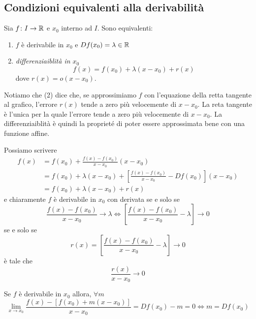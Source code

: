\documentclass[a4paper]{article}
\begin{document}
\subsection{Condizioni equivalenti alla derivabilità}

\begin{snippettheorem}{}
    Sia \(f \colon I \to \mathbb{R}\) e \(x_0\) interno ad \(I\).
    Sono equivalenti:
    \begin{enumerate}
        \item \(f\) è derivabile in \(x_0\) e \(Df(x_0) = \lambda \in \mathbb{R}\)
        \item \emph{differenziaiblità in \(x_0\)} \[
            f(x) = f(x_0) + \lambda(x-x_0) + r(x)
        \]
        dove \(r(x) = o(x-x_0)\).
    \end{enumerate}
\end{snippettheorem}

Notiamo che (2) dice che, se approssimiamo \(f\) con l'equazione della retta tangente
al grafico, l'errore \(r(x)\) tende a zero più velocemente di \(x-x_0\).
La reta tangente è l'unica per la quale l'errore tende a zero più velocemente di \(x-x_0\).
La differenziaiblità è quindi la proprieté di poter essere approssimata bene con una funzione affine.

\begin{snippetproof}{}
    Possiamo scrivere
    \begin{align*}
        f(x) &= f(x_0) + \frac{f(x) - f(x_0)}{x-x_0}(x-x_0) \\
        &= f(x_0) + \lambda (x-x_0) + \left[
            \frac{f(x) - f(x_0)}{x-x_0} - Df(x_0)
        \right](x-x_0) \\
        &= f(x_0) + \lambda(x-x_0) + r(x)
    \end{align*}
    e chiaramente \(f\) è derivabile in \(x_0\) con derivata se e solo se
    \[
        \frac{f(x) - f(x_0)}{x-x_0} \to \lambda
        \iff \left[\frac{f(x)-f(x_0)}{x-x_0} - \lambda\right] \to 0
    \]
    se e solo se
    \[
        r(x) = \left[\frac{f(x) - f(x_0)}{x-x_0} - \lambda\right] \to 0 
    \]
    è tale che \[
        \frac{r(x)}{x-x_0} \to 0
    \]
\end{snippetproof}

\begin{snippetcorollary}{}
    Se \(f\) è derivabile in \(x_0\) allora,
    \(\forall m\)
    \[
        \lim_{x\to x_0} \frac{f(x) - \left[f(x_0) + m(x-x_0)\right]}{x-x_0}
        = Df(x_0) - m = 0 \iff m = Df(x_0)
    \]
\end{snippetcorollary}
\end{document}
